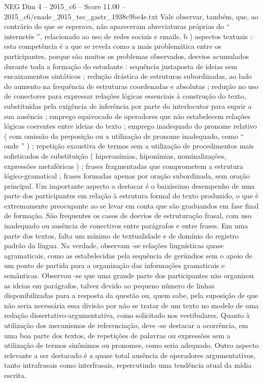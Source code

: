 \begin{textsample}{NEG Dim 4 – 2015\_c6 – Score 11.00 – 2015\_c6/enade\_2015\_tec\_gastr\_1938c9be4e.txt}
Vale observar, também, que, ao contrário do que se esperava, não apareceram abreviaturas próprias do “ internetês ”, relacionado ao uso de redes sociais e emails. b ) aspectos textuais : esta competência é a que se revela como a mais problemática entre os participantes, porque são muitos os problemas observados, desvios acumulados durante toda a formação do estudante : sequência justaposta de ideias sem encaixamentos sintáticos ; redução drástica de estruturas subordinadas, ao lado do aumento na frequência de estruturas coordenadas e absolutas ; redução no uso de conectores para expressar relações lógicas essenciais à construção do texto, substituídas pela exigência de inferência por parte do interlocutor para suprir a sua ausência ; emprego equivocado de operadores que não estabelecem relações lógicas coerentes entre ideias do texto ; emprego inadequado do pronome relativo ( com omissão da preposição ou a utilização de pronome inadequado, como “ onde ” ) ; repetição exaustiva de termos sem a utilização de procedimentos mais sofisticados de substituição ( hiperonímias, hiponímias, nominalizações, expressões metafóricas ) ; frases fragmentadas que comprometem a estrutura lógico-gramatical ; frases formadas apenas por oração subordinada, sem oração principal.
Um importante aspecto a destacar é o baixíssimo desempenho de uma parte dos participantes em relação à estrutura formal do texto produzido, o que é extremamente preocupante ao se levar em conta que são graduandos em fase final de formação.
São frequentes os casos de desvios de estruturação frasal, com uso inadequado ou ausência de conectivos entre parágrafos e entre frases.
Em uma parte dos textos, falta um mínimo de textualidade e de domínio do registro padrão da língua.
Na verdade, observam -se relações linguísticas quase agramaticais, como as estabelecidas pela sequência de gerúndios sem o apoio de um ponto de partida para a organização das informações gramaticais e semânticas.
Observou -se que uma grande parte dos participantes não organizou as ideias em parágrafos, talvez devido ao pequeno número de linhas disponibilizadas para a resposta da questão ou, quem sabe, pela suposição de que não seria necessária essa divisão por não se tratar de um texto no modelo de uma redação dissertativo-argumentativa, como solicitado nos vestibulares.
Quanto à utilização dos mecanismos de referenciação, deve -se destacar a ocorrência, em uma boa parte dos textos, de repetições de palavras ou expressões sem a utilização de termos sinônimos ou pronomes, como seria adequado.
Outro aspecto relevante a ser destacado é a quase total ausência de operadores argumentativos, tanto intrafrasais como interfrasais, repercutindo uma tendência atual da mídia escrita.

\end{textsample}
